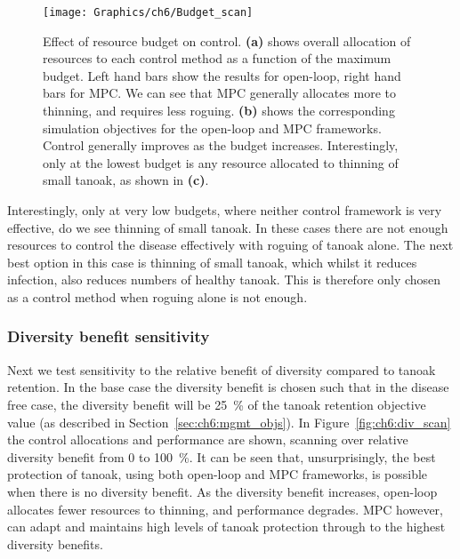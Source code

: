 \begin{figure}
    \begin{center}
        \texttt{[image: Graphics/ch6/Budget\_scan]}
        \caption[Varying the control budget]{Effect of resource budget on control. \textbf{(a)} shows overall allocation of resources to each control method as a function of the maximum budget. Left hand bars show the results for open-loop, right hand bars for MPC\@. We can see that MPC generally allocates more to thinning, and requires less roguing. \textbf{(b)} shows the corresponding simulation objectives for the open-loop and MPC frameworks. Control generally improves as the budget increases. Interestingly, only at the lowest budget is any resource allocated to thinning of small tanoak, as shown in \textbf{(c)}.\label{fig:ch6:budget_scan}}
    \end{center}
\end{figure}

Interestingly, only at very low budgets, where neither control framework is very effective, do we see thinning of small tanoak. In these cases there are not enough resources to control the disease effectively with roguing of tanoak alone. The next best option in this case is thinning of small tanoak, which whilst it reduces infection, also reduces numbers of healthy tanoak. This is therefore only chosen as a control method when roguing alone is not enough.

\subsubsection{Diversity benefit sensitivity}\label{sec:ch6:div_scan}

Next we test sensitivity to the relative benefit of diversity compared to tanoak retention. In the base case the diversity benefit is chosen such that in the disease free case, the diversity benefit will be \SI{25}{\percent} of the tanoak retention objective value (as described in Section~\ref{sec:ch6:mgmt_objs}). In Figure~\ref{fig:ch6:div_scan} the control allocations and performance are shown, scanning over relative diversity benefit from 0 to \SI{100}{\percent}. It can be seen that, unsurprisingly, the best protection of tanoak, using both open-loop and MPC frameworks, is possible when there is no diversity benefit. As the diversity benefit increases, open-loop allocates fewer resources to thinning, and performance degrades. MPC however, can adapt and maintains high levels of tanoak protection through to the highest diversity benefits.

